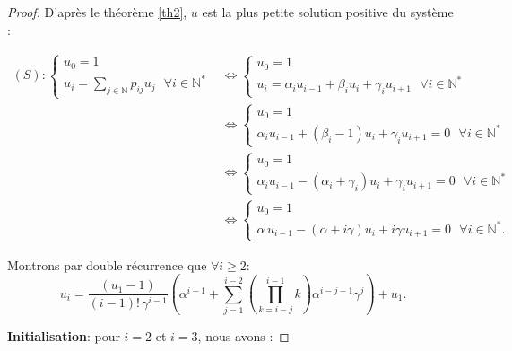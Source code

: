 \documentclass[12pt,a4paper]{report}
\theoremstyle{remark}
\begin{document}
\begin{proof}
D'après le théorème \ref{th2}, $u$ est la plus petite solution positive du système : 

\begin{align*}
(S) : \left\{
\begin{array}{ll}
        u_0=1\\
        u_i= \sum\limits_{j\in \mathbb{N}} p_{ij}u_j \ \ \ \forall i \in \mathbb{N}^*
    \end{array}
\right.
&\Longleftrightarrow  \left\{
\begin{array}{ll}
        u_0=1\\
        u_i= \alpha_i u_{i-1} + \beta_i u_i + \gamma_i u_{i+1} \ \ \ \forall i \in \mathbb{N}^*
    \end{array}
\right.  \\
&\Longleftrightarrow \left\{
\begin{array}{ll}
        u_0=1\\
        \alpha_i u_{i-1} + (\beta_i-1) u_i + \gamma_i u_{i+1} = 0 \ \ \ \forall i \in \mathbb{N}^*
    \end{array}
\right.  \\
 &\Longleftrightarrow \left\{
\begin{array}{ll}
        u_0=1\\
        \alpha_i u_{i-1} - (\alpha_i+\gamma_i) u_i + \gamma_i u_{i+1} = 0 \ \ \ \forall i \in \mathbb{N}^*
    \end{array}
\right.  \\
 &\Longleftrightarrow \left\{
\begin{array}{ll}
        u_0=1\\
        \alpha \, u_{i-1} - (\alpha+ i\gamma) u_i + i\gamma u_{i+1} = 0 \ \ \ \forall i \in \mathbb{N}^*.
    \end{array}
\right. 
\end{align*}

Montrons par double récurrence que $\forall i \geqslant 2$:
$$u_i = \frac{(u_1 - 1)}{(i-1)! \, \gamma^{i-1}} \left( \alpha^{i-1} + \sum_{j=1}^{i-2}\left(\prod_{k=i-j}^{i-1} k\right) \alpha^{i-j-1} \gamma^j \right) + u_1.$$

\textbf{Initialisation}: pour $i=2$ et $i=3$, nous avons :


\end{proof}
\end{document}
